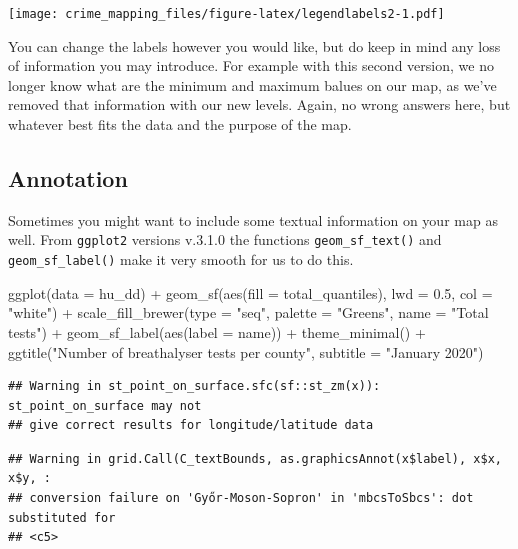 \documentclass[
]{book}
\newenvironment{Shaded}{\begin{snugshade}}{\end{snugshade}}
\newcommand{\AttributeTok}[1]{\textcolor[rgb]{0.77,0.63,0.00}{#1}}
\newcommand{\FloatTok}[1]{\textcolor[rgb]{0.00,0.00,0.81}{#1}}
\newcommand{\FunctionTok}[1]{\textcolor[rgb]{0.00,0.00,0.00}{#1}}
\newcommand{\NormalTok}[1]{#1}
\newcommand{\SpecialCharTok}[1]{\textcolor[rgb]{0.00,0.00,0.00}{#1}}
\newcommand{\StringTok}[1]{\textcolor[rgb]{0.31,0.60,0.02}{#1}}
\begin{document}
\texttt{[image: crime\_mapping\_files/figure-latex/legendlabels2-1.pdf]}

You can change the labels however you would like, but do keep in mind any loss of information you may introduce. For example with this second version, we no longer know what are the minimum and maximum balues on our map, as we've removed that information with our new levels. Again, no wrong answers here, but whatever best fits the data and the purpose of the map.

\hypertarget{annotation}{%
\subsection{Annotation}\label{annotation}}

Sometimes you might want to include some textual information on your map as well. From \texttt{ggplot2} versions v.3.1.0 the functions \texttt{geom\_sf\_text()} and \texttt{geom\_sf\_label()} make it very smooth for us to do this.

\begin{Shaded}
\begin{Highlighting}[]
\FunctionTok{ggplot}\NormalTok{(}\AttributeTok{data =}\NormalTok{ hu\_dd) }\SpecialCharTok{+} 
  \FunctionTok{geom\_sf}\NormalTok{(}\FunctionTok{aes}\NormalTok{(}\AttributeTok{fill =}\NormalTok{ total\_quantiles), }\AttributeTok{lwd =} \FloatTok{0.5}\NormalTok{, }\AttributeTok{col =} \StringTok{"white"}\NormalTok{) }\SpecialCharTok{+} 
  \FunctionTok{scale\_fill\_brewer}\NormalTok{(}\AttributeTok{type =} \StringTok{"seq"}\NormalTok{, }\AttributeTok{palette =} \StringTok{"Greens"}\NormalTok{, }\AttributeTok{name =} \StringTok{"Total tests"}\NormalTok{) }\SpecialCharTok{+} 
  \FunctionTok{geom\_sf\_label}\NormalTok{(}\FunctionTok{aes}\NormalTok{(}\AttributeTok{label =}\NormalTok{ name)) }\SpecialCharTok{+} 
  \FunctionTok{theme\_minimal}\NormalTok{() }\SpecialCharTok{+} 
  \FunctionTok{ggtitle}\NormalTok{(}\StringTok{"Number of breathalyser tests per county"}\NormalTok{, }\AttributeTok{subtitle =} \StringTok{"January 2020"}\NormalTok{)}
\end{Highlighting}
\end{Shaded}

\begin{verbatim}
## Warning in st_point_on_surface.sfc(sf::st_zm(x)): st_point_on_surface may not
## give correct results for longitude/latitude data
\end{verbatim}

\begin{verbatim}
## Warning in grid.Call(C_textBounds, as.graphicsAnnot(x$label), x$x, x$y, :
## conversion failure on 'Győr-Moson-Sopron' in 'mbcsToSbcs': dot substituted for
## <c5>
\end{verbatim}
\end{document}
